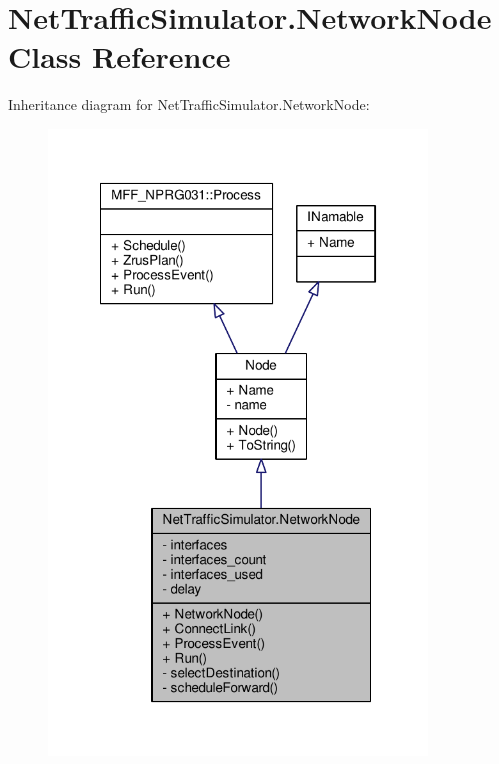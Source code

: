 \hypertarget{classNetTrafficSimulator_1_1NetworkNode}{\section{Net\-Traffic\-Simulator.\-Network\-Node Class Reference}
\label{classNetTrafficSimulator_1_1NetworkNode}
}


Inheritance diagram for Net\-Traffic\-Simulator.\-Network\-Node\-:\nopagebreak
\begin{figure}[H]
\begin{center}
\leavevmode
\includegraphics[width=285pt]{classNetTrafficSimulator_1_1NetworkNode__inherit__graph}
\end{center}
\end{figure}


